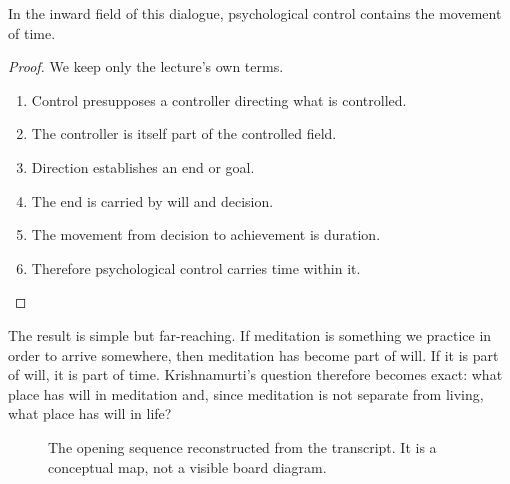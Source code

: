 \begin{proposition}
In the inward field of this dialogue, psychological control contains the movement of time.
\end{proposition}

\begin{proof}
We keep only the lecture's own terms.
\begin{enumerate}
\item Control presupposes a controller directing what is controlled.
\item The controller is itself part of the controlled field.
\item Direction establishes an end or goal.
\item The end is carried by will and decision.
\item The movement from decision to achievement is duration.
\item Therefore psychological control carries time within it.
\end{enumerate}
\end{proof}

The result is simple but far-reaching. If meditation is something we practice in order to arrive somewhere, then meditation has become part of will. If it is part of will, it is part of time. Krishnamurti's question therefore becomes exact: what place has will in meditation and, since meditation is not separate from living, what place has will in life?

\begin{figure}
\centering
{}
\caption{The opening sequence reconstructed from the transcript. It is a conceptual map, not a visible board diagram.}
\end{figure}

